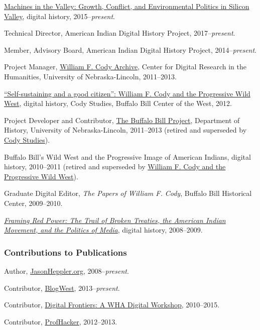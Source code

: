 \href{http://dissertation.jasonheppler.org}{Machines in the Valley:
Growth, Conflict, and Environmental Politics in Silicon Valley}, digital
history, 2015--\emph{present}.

Technical Director, American Indian Digital History Project,
2017--\emph{present}.

Member, Advisory Board, American Indian Digital History Project,
2014--\emph{present}.

Project Manager, \href{http://codyarchive.org/}{William F. Cody
Archive}, Center for Digital Research in the Humanities, University of
Nebraska-Lincoln, 2011--2013.

\href{http://www.codystudies.org/showindians/}{``Self-sustaining and a
good citizen'': William F. Cody and the Progressive Wild West}, digital
history, Cody Studies, Buffalo Bill Center of the West, 2012.

Project Developer and Contributor,
\href{http://buffalobillproject.unl.edu/}{The Buffalo Bill Project},
Department of History, University of Nebraska-Lincoln, 2011--2013
(retired and superseded by \href{http://www.codystudies.org/}{Cody
Studies}).

Buffalo Bill's Wild West and the Progressive Image of American Indians,
digital history, 2010--2011 (retired and superseded by
\href{http://www.codystudies.org/showindians/}{William F. Cody and the
Progressive Wild West}).

Graduate Digital Editor, \emph{The Papers of William F. Cody}, Buffalo
Bill Historical Center, 2009--2010.

\emph{\href{http://framingredpower.org}{Framing Red Power: The Trail of
Broken Treaties, the American Indian Movement, and the Politics of
Media}}, digital history, 2008--2009.

\subsubsection{Contributions to
Publications}\label{contributions-to-publications}

Author, \href{http://jasonheppler.org}{JasonHeppler.org},
2008--\emph{present}.

Contributor, \href{http://blogwest.org/}{BlogWest},
2013--\emph{present}.

Contributor, \href{http://whadigitalfrontiers.com/}{Digital Frontiers: A
WHA Digital Workshop}, 2010--2015.

Contributor, \href{http://chronicle.com/blogs/profhacker/}{ProfHacker},
2012--2013.

